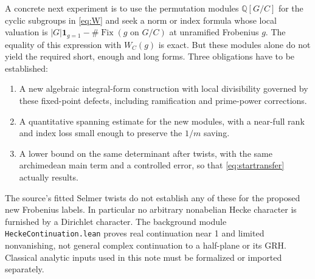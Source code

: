 \documentclass[11pt]{article}
\theoremstyle{remark}\newtheorem{remark}[theorem]{Remark}
\DeclareMathOperator{\Fix}{Fix}
\newcommand{\Q}{\mathbb Q}
\newcommand{\one}{\mathbf 1}
\begin{document}
A concrete next experiment is to use the permutation modules
$\Q[G/C]$ for the cyclic subgroups in \eqref{eq:W} and seek a norm or
index formula whose local valuation is
$|G|\one_{g=1}-\#\Fix(g\text{ on }G/C)$ at unramified Frobenius $g$.
The equality of this expression with $W_C(g)$ is exact. But these
modules alone do not yield the required short, enough and long
forms. Three obligations have to be established:
\begin{enumerate}
\item A new algebraic integral-form construction with local
divisibility governed by these fixed-point defects, including
ramification and prime-power corrections.
\item A quantitative spanning estimate for the new modules, with a
near-full rank and index loss small enough to preserve the
$1/m$ saving.
\item A lower bound on the same determinant after twists, with the
same archimedean main term and a controlled error, so that
\eqref{eq:startransfer} actually results.
\end{enumerate}
The source's fitted Selmer twists do not establish any of these
for the proposed new Frobenius labels. In particular no arbitrary
nonabelian Hecke character is furnished by a Dirichlet character.
The background module \texttt{HeckeContinuation.lean} proves real
continuation near 1 and limited nonvanishing, not general complex
continuation to a half-plane or its GRH. Classical analytic inputs
used in this note must be formalized or imported separately.
\end{document}

